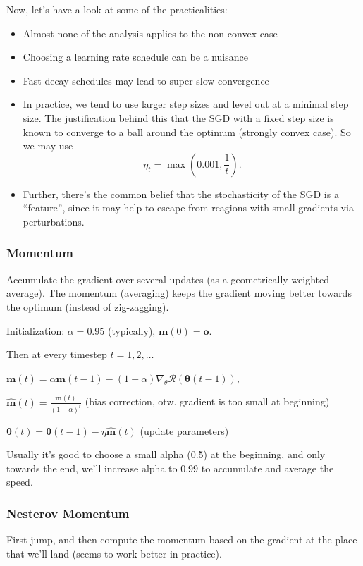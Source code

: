 \documentclass[a2paper,4pt]{extarticle}
\newcommand{\cR}{\mathcal{R}}
\renewcommand{\vec}[1]{\mathbf{#1}}
\newcommand{\vm}{\vec{m}}
\newcommand{\vo}{\vec{o}}
\newcommand{\vhm}{\widehat{\vec{m}}}
\newcommand{\vtheta}{\boldsymbol{\theta}}
\begin{document}
\begin{landscape}
\begin{multicols*}{7}
Now, let's have a look at some of the practicalities:
\begin{itemize}
  \item Almost none of the analysis applies to the non-convex case
  \item Choosing a learning rate schedule can be a nuisance
  \item Fast decay schedules may lead to super-slow convergence
  \item In practice, we tend to use larger step sizes and level out at a minimal
  step size. The justification behind this that the SGD with a fixed step size
  is known to converge to a ball around the optimum (strongly convex case). So
  we may use
  \[
  \eta_t=\max(0.001,\frac{1}{t}).
  \]
  \item Further, there's the common belief that the stochasticity of the SGD is
  a ``feature'', since it may help to escape from reagions with small gradients
  via perturbations.
\end{itemize}

\subsubsection{Momentum}

Accumulate the gradient over several updates (as a geometrically weighted
average). The momentum (averaging) keeps the gradient moving better towards the
optimum (instead of zig-zagging).

Initialization: $\alpha=0.95$ (typically), $\vm(0)=\vo$.

Then at every timestep $t=1,2,\ldots$

$
\vm(t)=\alpha \vm(t-1)-(1-\alpha)\nabla_\theta\cR(\vtheta(t-1)),
$

$
\vhm(t)=\frac{\vm(t)}{(1-\alpha)^t}
$ \quad(bias correction, otw. gradient is too small at beginning)

$
\vtheta(t)=\vtheta(t-1)-\eta\vhm(t)
$ \quad (update parameters)

Usually it's good to choose a small alpha (0.5) at the beginning, and only
towards the end, we'll increase alpha to 0.99 to accumulate and average the
speed.

\subsubsection{Nesterov Momentum}

First jump, and then compute the momentum based on the gradient at the place
that we'll land (seems to work better in practice).


\end{multicols*}
\end{landscape}
\end{document}
